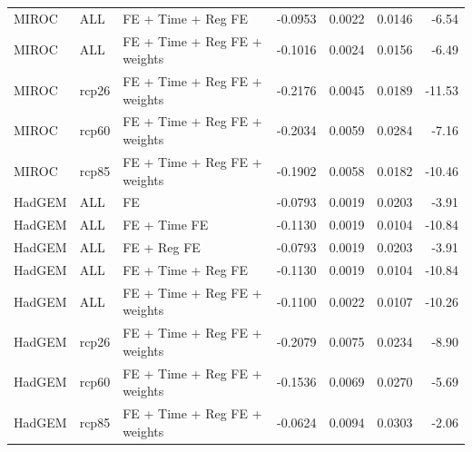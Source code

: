 \begin{table}[ht]
\begin{tabular}{lllrrrr}
  MIROC & ALL & FE + Time + Reg FE & -0.0953 & 0.0022 & 0.0146 & -6.54 \\ 
  MIROC & ALL & FE + Time + Reg FE + weights & -0.1016 & 0.0024 & 0.0156 & -6.49 \\ 
  MIROC & rcp26 & FE + Time + Reg FE + weights & -0.2176 & 0.0045 & 0.0189 & -11.53 \\ 
  MIROC & rcp60 & FE + Time + Reg FE + weights & -0.2034 & 0.0059 & 0.0284 & -7.16 \\ 
  MIROC & rcp85 & FE + Time + Reg FE + weights & -0.1902 & 0.0058 & 0.0182 & -10.46 \\ 
  HadGEM & ALL & FE & -0.0793 & 0.0019 & 0.0203 & -3.91 \\ 
  HadGEM & ALL & FE + Time FE & -0.1130 & 0.0019 & 0.0104 & -10.84 \\ 
  HadGEM & ALL & FE + Reg FE & -0.0793 & 0.0019 & 0.0203 & -3.91 \\ 
  HadGEM & ALL & FE + Time + Reg FE & -0.1130 & 0.0019 & 0.0104 & -10.84 \\ 
  HadGEM & ALL & FE + Time + Reg FE + weights & -0.1100 & 0.0022 & 0.0107 & -10.26 \\ 
  HadGEM & rcp26 & FE + Time + Reg FE + weights & -0.2079 & 0.0075 & 0.0234 & -8.90 \\ 
  HadGEM & rcp60 & FE + Time + Reg FE + weights & -0.1536 & 0.0069 & 0.0270 & -5.69 \\ 
  HadGEM & rcp85 & FE + Time + Reg FE + weights & -0.0624 & 0.0094 & 0.0303 & -2.06 \\ 
   \hline
\end{tabular}
\end{table}
